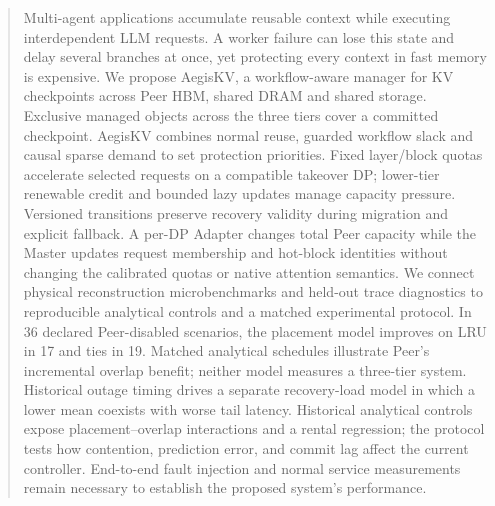 \begin{abstract}
Multi-agent applications accumulate reusable context while executing
interdependent LLM requests. A worker failure can lose this state and delay
several branches at once, yet protecting every context in fast memory is
expensive. We propose AegisKV, a workflow-aware manager for KV checkpoints
across Peer HBM, shared DRAM and shared storage. Exclusive managed objects
across the three tiers cover a committed checkpoint. AegisKV combines
normal reuse, guarded workflow slack and causal sparse demand to set
protection priorities. Fixed layer/block quotas accelerate selected
requests on a compatible takeover DP; lower-tier renewable credit and
bounded lazy updates manage capacity pressure.
Versioned transitions preserve recovery validity during migration and
explicit fallback. A per-DP Adapter changes total Peer capacity while the
Master updates request membership and hot-block identities without
changing the calibrated quotas or native attention semantics. We connect
physical reconstruction microbenchmarks and held-out trace diagnostics
to reproducible analytical controls and a matched experimental protocol.
In 36 declared Peer-disabled scenarios, the placement model improves on
LRU in 17 and ties in 19. Matched analytical schedules illustrate Peer's
incremental overlap benefit; neither model measures a three-tier system. Historical outage timing drives a separate recovery-load model in which
a lower mean coexists with worse tail latency. Historical analytical
controls expose placement--overlap interactions and a rental regression;
the protocol tests how contention, prediction error, and commit lag affect
the current controller. End-to-end fault injection and normal
service measurements remain necessary to establish the proposed system's
performance.
\end{abstract}
